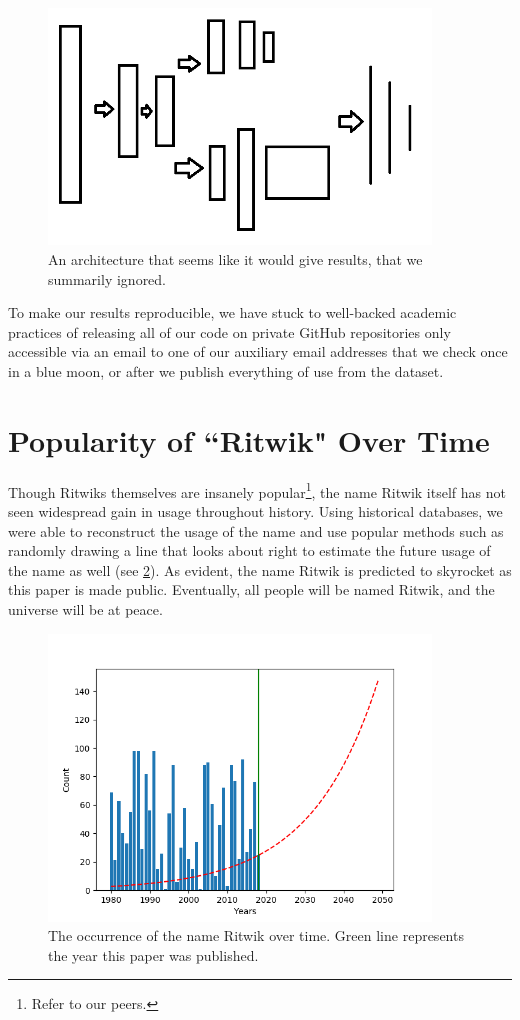 \documentclass[]{article}
\begin{document}
\begin{figure}[h]
	\centering
	\includegraphics[width=4in]{figures/Neuralnet}
	\caption{An architecture that seems like it would give results, that we summarily ignored.}
	\label{fig:neuralnet}
\end{figure}

To make our results reproducible, we have stuck to well-backed academic practices of releasing all of our code on private GitHub repositories only accessible via an email to one of our auxiliary email addresses that we check once in a blue moon, or after we publish everything of use from the dataset.

\section{Popularity of ``Ritwik" Over Time}
Though Ritwiks themselves are insanely popular\footnote{Refer to our peers.}, the name Ritwik itself has not seen widespread gain in usage throughout history. Using historical databases, we were able to reconstruct the usage of the name and use popular methods such as randomly drawing a line that looks about right to estimate the future usage of the name as well (see \ref{fig:usageofritwik}).
As evident, the name Ritwik is predicted to skyrocket as this paper is made public. Eventually, all people will be named Ritwik, and the universe will be at peace.
\begin{figure}[h]
	\centering
	\includegraphics[width=4in]{figures/UsageOfRitwik}
	\caption{The occurrence of the name Ritwik over time. Green line represents the year this paper was published.}
	\label{fig:usageofritwik}
\end{figure}
\end{document}
